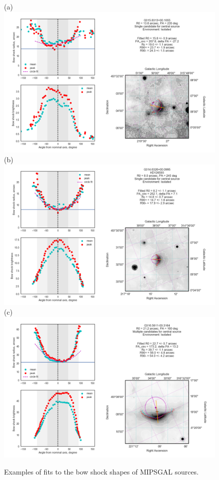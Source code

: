 \begin{figure}
  (a)\\
  \includegraphics[width=\linewidth]{figs/0510-3-star}
  (b)\\
  \includegraphics[width=\linewidth]{figs/0506-4-star}
  (c)\\
  \includegraphics[width=\linewidth]{figs/0517-5-star}
  \caption[]{Examples of fits to the bow shock shapes of MIPSGAL sources.}
  \label{fig:mipsgal-examples}
\end{figure}


